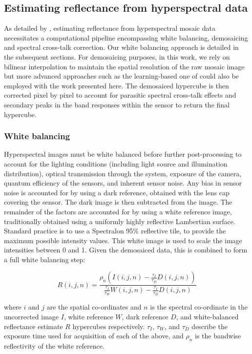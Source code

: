 %
\subsection{Estimating reflectance from hyperspectral data}
\label{methodnecessity}
%
As detailed by \cite{Pichette2017}, estimating reflectance from hyperspectral mosaic data necessitates a computational pipeline encompassing white balancing, demosaicing and spectral cross-talk correction.
%
%
Our white balancing approach is detailed in the subsequent sections.
For demosaicing purposes, in this work, we rely on bilinear interpolation to maintain the spatial resolution of the raw mosaic image but more advanced approaches such as the learning-based one of \cite{Li2021} could also be employed with the work presented here.
The demosaiced hypercube is then corrected pixel by pixel to account for parasitic spectral cross-talk effects and secondary peaks in the band responses within the sensor to return the final hypercube\cite{Pichette2017}.

\subsubsection{White balancing}
\label{processingwhite}
Hyperspectral images must be white balanced before further post-processing to account for the lighting conditions (including light source and illumination distribution), optical transmission through the system, exposure of the camera, quantum efficiency of the sensors, and inherent sensor noise.
Any bias in sensor noise is accounted for by using a dark reference, obtained with the lens cap covering the sensor.
The dark image is then subtracted from the image.
The remainder of the factors are accounted for by using a white reference image, traditionally obtained using a uniformly highly reflective Lambertian surface.
Standard practice is to use a Spectralon 95\% reflective tile, to provide the maximum possible intensity values.
This white image is used to scale the image intensities between 0 and 1.
Given the demosaiced data, this is combined to form a full white balancing step:
%
%
\begin{linenomath*}
\begin{equation}
	R(i,j,n) = \frac{\rho_n\left(I(i,j,n) - \frac{\tau_I}{\tau_D}D(i,j,n)\right)}{\frac{\tau_I}{\tau_W}W(i,j,n) - \frac{\tau_I}{\tau_D}D(i,j,n)}
\label{eq:WBfull}
\end{equation}
\end{linenomath*}
where $i$ and $j$ are the spatial co-ordinates and $n$ is the spectral co-ordinate in the uncorrected image $I$, white reference $W$, dark reference $D$, and white-balanced reflectance estimate $R$ hypercubes respectively.
$\tau_I$, $\tau_W$, and $\tau_D$ describe the exposure time used for acquisition of each of the above, and $\rho_n$ is the bandwise reflectivity of the white reference.


